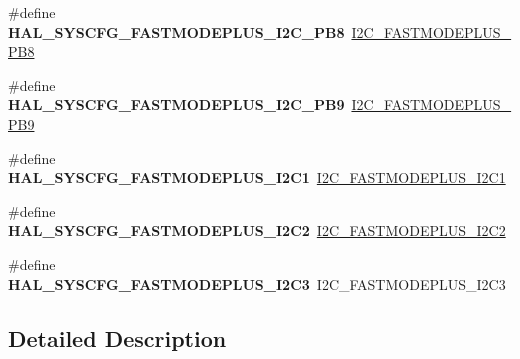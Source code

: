 \begin{DoxyCompactItemize}
\item 
\mbox{\label{group___h_a_l___s_y_s_c_f_g___aliased___defines_gad8342aebd8090a8777d84165d5726b62}} 
\#define {\bfseries H\+A\+L\+\_\+\+S\+Y\+S\+C\+F\+G\+\_\+\+F\+A\+S\+T\+M\+O\+D\+E\+P\+L\+U\+S\+\_\+\+I2\+C\+\_\+\+P\+B8}~\hyperlink{group___i2_c_ex___fast_mode_plus_gaf8d6aa219f041b552b3d3cd53cb78a26}{I2\+C\+\_\+\+F\+A\+S\+T\+M\+O\+D\+E\+P\+L\+U\+S\+\_\+\+P\+B8}
\item 
\mbox{\label{group___h_a_l___s_y_s_c_f_g___aliased___defines_ga8ace04770933b1fbf1b0e28abd6f3a25}} 
\#define {\bfseries H\+A\+L\+\_\+\+S\+Y\+S\+C\+F\+G\+\_\+\+F\+A\+S\+T\+M\+O\+D\+E\+P\+L\+U\+S\+\_\+\+I2\+C\+\_\+\+P\+B9}~\hyperlink{group___i2_c_ex___fast_mode_plus_gafab6e63d100bf337bf9f0bf6a607636d}{I2\+C\+\_\+\+F\+A\+S\+T\+M\+O\+D\+E\+P\+L\+U\+S\+\_\+\+P\+B9}
\item 
\mbox{\label{group___h_a_l___s_y_s_c_f_g___aliased___defines_gad982b1937d6178bc74b6f95e3d343ab1}} 
\#define {\bfseries H\+A\+L\+\_\+\+S\+Y\+S\+C\+F\+G\+\_\+\+F\+A\+S\+T\+M\+O\+D\+E\+P\+L\+U\+S\+\_\+\+I2\+C1}~\hyperlink{group___i2_c_ex___fast_mode_plus_ga3a8064ecfa3b33115f62123f7162770e}{I2\+C\+\_\+\+F\+A\+S\+T\+M\+O\+D\+E\+P\+L\+U\+S\+\_\+\+I2\+C1}
\item 
\mbox{\label{group___h_a_l___s_y_s_c_f_g___aliased___defines_gaa415be62939648ababfdce87dea7c8d4}} 
\#define {\bfseries H\+A\+L\+\_\+\+S\+Y\+S\+C\+F\+G\+\_\+\+F\+A\+S\+T\+M\+O\+D\+E\+P\+L\+U\+S\+\_\+\+I2\+C2}~\hyperlink{group___i2_c_ex___fast_mode_plus_gaa5c33513afa036a6f97e9cbf2d61f4b2}{I2\+C\+\_\+\+F\+A\+S\+T\+M\+O\+D\+E\+P\+L\+U\+S\+\_\+\+I2\+C2}
\item 
\mbox{\label{group___h_a_l___s_y_s_c_f_g___aliased___defines_ga3347764cd910d40c261ffcfa150b0912}} 
\#define {\bfseries H\+A\+L\+\_\+\+S\+Y\+S\+C\+F\+G\+\_\+\+F\+A\+S\+T\+M\+O\+D\+E\+P\+L\+U\+S\+\_\+\+I2\+C3}~I2\+C\+\_\+\+F\+A\+S\+T\+M\+O\+D\+E\+P\+L\+U\+S\+\_\+\+I2\+C3
\end{DoxyCompactItemize}


\subsection{Detailed Description}
